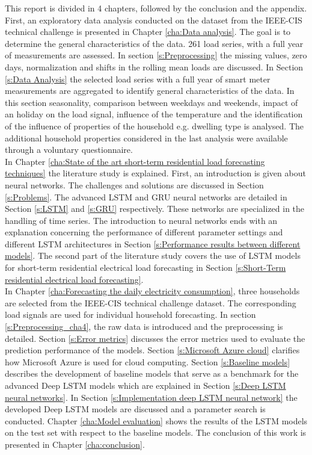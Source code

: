 This report is divided in 4 chapters, followed by the conclusion and the appendix. First, an exploratory data analysis conducted on the dataset from the IEEE-CIS technical challenge is presented in Chapter \ref{cha:Data analysis}. The goal is to determine the general characteristics of the data. 261 load series, with a full year of measurements are assessed. In section \ref{s:Preprocessing} the missing values, zero days, normalization and shifts in the rolling mean loads are discussed. In Section \ref{s:Data Analysis} the selected load series with a full year of smart meter measurements are aggregated to identify general characteristics of the data. In this section seasonality, comparison between weekdays and weekends, impact of an holiday on the load signal, influence of the temperature and the identification of the influence of properties of the household e.g. dwelling type is analysed. The additional household properties considered in the last analysis were available through a voluntary questionnaire. \\
In Chapter \ref{cha:State of the art short-term residential load forecasting techniques} the literature study is explained. First, an introduction is given about neural networks. The challenges and solutions are discussed in Section \ref{s:Problems}. The advanced LSTM and GRU neural networks are detailed in Section \ref{s:LSTM} and \ref{s:GRU} respectively. These networks are specialized in the handling of time series. The introduction to neural networks ends with an explanation concerning the performance of different parameter settings and different LSTM architectures in Section \ref{s:Performance results between different models}. The second part of the literature study covers the use of LSTM models for short-term residential electrical load forecasting in Section \ref{s:Short-Term residential electrical load forecasting}.\\
In Chapter \ref{cha:Forecasting the daily electricity consumption}, three households are selected from the IEEE-CIS technical challenge dataset. The corresponding load signals are used for individual household forecasting. In section \ref{s:Preprocessing_cha4}, the raw data is introduced and the preprocessing is detailed. Section \ref{s:Error metrics} discusses the error metrics used to evaluate the prediction performance of the models. Section \ref{s:Microsoft Azure cloud} clarifies how Microsoft Azure is used for cloud computing. Section \ref{s:Baseline models} describes the development of baseline models that serve as a benchmark for the advanced Deep LSTM models which are explained in Section \ref{s:Deep LSTM neural networks}. In Section \ref{s:Implementation deep LSTM neural network} the developed Deep LSTM models are discussed and a parameter search is conducted. Chapter \ref{cha:Model evaluation} shows the results of the LSTM models on the test set with respect to the baseline models. The conclusion of this work is presented in Chapter \ref{cha:conclusion}.





